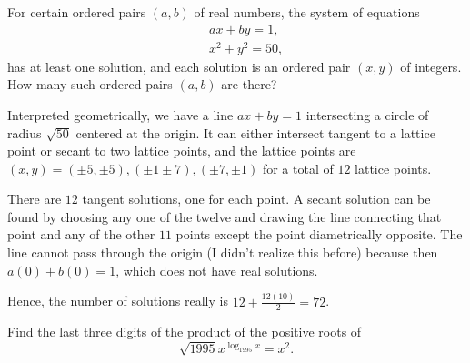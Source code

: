 \begin{question}[name={1994 AIME, \href{https://artofproblemsolving.com/community/c4p394728}{Problem 7}}]
	For certain ordered pairs $(a,b)$ of real numbers, the system of equations\begin{eqnarray*} && ax+by =1,\\ &&x^2+y^2=50,\end{eqnarray*}has at least one solution, and each solution is an ordered pair $(x,y)$ of integers. How many such ordered pairs $(a,b)$ are there?
\end{question}


\begin{solution}[name={Solution by Qiaochu Yuan}]
	Interpreted geometrically, we have a line $ax + by = 1$ intersecting a circle of radius $\sqrt{50}$ centered at the origin. It can either intersect tangent to a lattice point or secant to two lattice points, and the lattice points are $(x, y) = (\pm 5, \pm 5), (\pm 1 \pm 7), (\pm 7, \pm 1)$ for a total of $12$ lattice points.
	
	There are $12$ tangent solutions, one for each point. A secant solution can be found by choosing any one of the twelve and drawing the line connecting that point and any of the other $11$ points except the point diametrically opposite. The line cannot pass through the origin (I didn't realize this before) because then $a(0) + b(0) = 1$, which does not have real solutions.
	
	Hence, the number of solutions really is $12 + \frac{12(10)}{2} = \boxed{72}$.
\end{solution}












\begin{question}[name={1995 AIME, \href{https://artofproblemsolving.com/community/c4p394465}{Problem 2}}]
	Find the last three digits of the product of the positive roots of\[ \sqrt{1995}x^{\log_{1995}x}=x^2. \]
\end{question}


